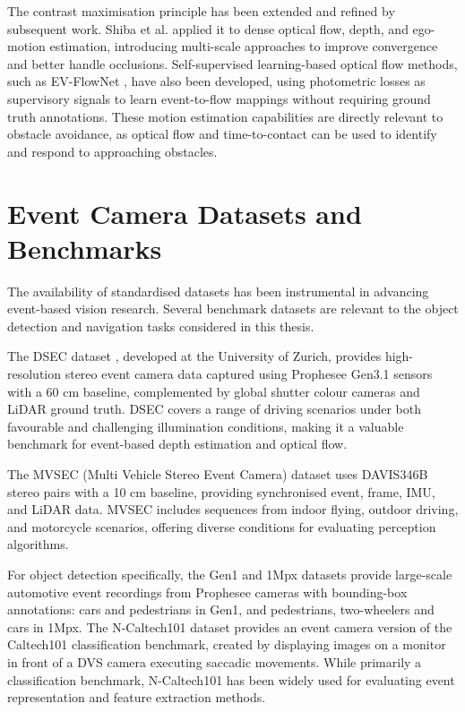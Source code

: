 \documentclass[11pt, a4paper]{report}
\begin{document}
The contrast maximisation principle has been extended and refined by subsequent work. Shiba et al. \cite{shiba2024secrets} applied it to dense optical flow, depth, and ego-motion estimation, introducing multi-scale approaches to improve convergence and better handle occlusions. Self-supervised learning-based optical flow methods, such as EV-FlowNet \cite{zhu2018evflownet}, have also been developed, using photometric losses as supervisory signals to learn event-to-flow mappings without requiring ground truth annotations. These motion estimation capabilities are directly relevant to obstacle avoidance, as optical flow and time-to-contact can be used to identify and respond to approaching obstacles.

\section{Event Camera Datasets and Benchmarks}
The availability of standardised datasets has been instrumental in advancing event-based vision research. Several benchmark datasets are relevant to the object detection and navigation tasks considered in this thesis. 

The DSEC dataset \cite{gehrig2021dsec}, developed at the University of Zurich, provides high-resolution stereo event camera data captured using Prophesee Gen3.1 sensors with a 60 cm baseline, complemented by global shutter colour cameras and LiDAR ground truth. DSEC covers a range of driving scenarios under both favourable and challenging illumination conditions, making it a valuable benchmark for event-based depth estimation and optical flow. 

The MVSEC (Multi Vehicle Stereo Event Camera) dataset \cite{zhu2018multivehicle} uses DAVIS346B stereo pairs with a 10 cm baseline, providing synchronised event, frame, IMU, and LiDAR data. MVSEC includes sequences from indoor flying, outdoor driving, and motorcycle scenarios, offering diverse conditions for evaluating perception algorithms. 

For object detection specifically, the Gen1 \cite{detournemire2020large} and 1Mpx \cite{perot2020learning} datasets provide large-scale automotive event recordings from Prophesee cameras with bounding-box annotations: cars and pedestrians in Gen1, and pedestrians, two-wheelers and cars in 1Mpx. The N-Caltech101 dataset \cite{orchard2015converting} provides an event camera version of the Caltech101 classification benchmark, created by displaying images on a monitor in front of a DVS camera executing saccadic movements. While primarily a classification benchmark, N-Caltech101 has been widely used for evaluating event representation and feature extraction methods. 
\end{document}
